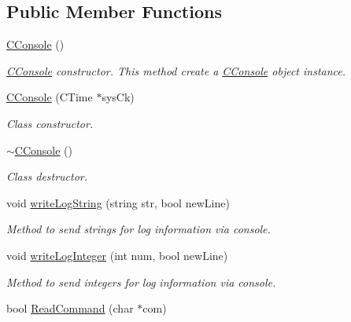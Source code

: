\subsection*{Public Member Functions}
\begin{DoxyCompactItemize}
\item 
\mbox{\hyperlink{class_c_console_a9ff3a14fd32fec13a98fd6064d26c861}{C\+Console}} ()
\begin{DoxyCompactList}\small\item\em \mbox{\hyperlink{class_c_console}{C\+Console}} constructor. This method create a \mbox{\hyperlink{class_c_console}{C\+Console}} object instance. \end{DoxyCompactList}\item 
\mbox{\label{class_c_console_a43dc951b007232f5cc98230c160813f3}} 
\mbox{\hyperlink{class_c_console_a43dc951b007232f5cc98230c160813f3}{C\+Console}} (C\+Time $\ast$sys\+Ck)
\begin{DoxyCompactList}\small\item\em Class constructor. \end{DoxyCompactList}\item 
\mbox{\label{class_c_console_a1d1ecc48fc4de70bfe0f6530c9d3bfc5}} 
\mbox{\hyperlink{class_c_console_a1d1ecc48fc4de70bfe0f6530c9d3bfc5}{$\sim$\+C\+Console}} ()
\begin{DoxyCompactList}\small\item\em Class destructor. \end{DoxyCompactList}\item 
void \mbox{\hyperlink{class_c_console_a23af1eebefd7cce94b4bdd5cc430e360}{write\+Log\+String}} (string str, bool new\+Line)
\begin{DoxyCompactList}\small\item\em Method to send strings for log information via console. \end{DoxyCompactList}\item 
void \mbox{\hyperlink{class_c_console_ad6f84380de57942510c8abfc5226f6c5}{write\+Log\+Integer}} (int num, bool new\+Line)
\begin{DoxyCompactList}\small\item\em Method to send integers for log information via console. \end{DoxyCompactList}\item 
bool \mbox{\hyperlink{class_c_console_a93d2d9f396de1137b6aefe87643ff7fe}{Read\+Command}} (char $\ast$com)
\end{DoxyCompactItemize}


